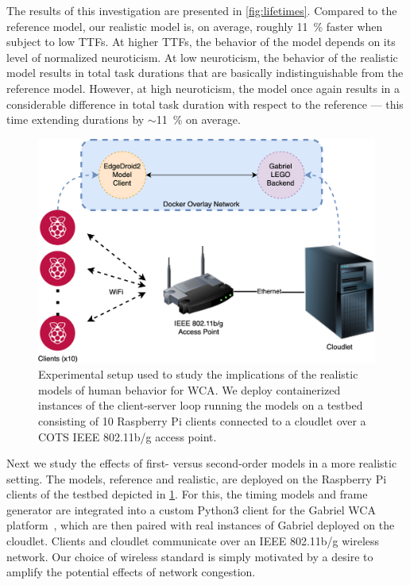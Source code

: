 The results of this investigation are presented in \cref{fig:lifetimes}.
Compared to the reference model, our realistic model is, on average, roughly \SI{11}{\percent} faster when subject to low \glspl{TTF}.
At higher \glspl{TTF}, the behavior of the model depends on its level of normalized neuroticism.
At low neuroticism, the behavior of the realistic model results in total task durations that are basically indistinguishable from the reference model.
However, at high neuroticism, the model once again results in a considerable difference in total task duration with respect to the reference --- this time extending durations by \ensuremath{\sim}\SI{11}{\percent} on average.

\begin{figure}
    \centering
    \includegraphics[width=.9\textwidth]{figs/EdgeDroid2ExperimentalSetup}
    \caption{%
        Experimental setup used to study the implications of the realistic models of human behavior for \gls{WCA}.
        We deploy containerized instances of the client-server loop running the models on a testbed consisting of \num{10} Raspberry Pi clients connected to a cloudlet over a \gls{COTS} \gls{IEEE} \num{802.11}b/g access point.
    }\label{fig:expsetup}
\end{figure}

Next we study the effects of first- versus second-order models in a more realistic setting.
The models, reference and realistic, are deployed on the Raspberry Pi clients of the testbed depicted in \cref{fig:expsetup}.
For this, the timing models and frame generator are integrated into a custom Python3 client for the Gabriel \gls{WCA} platform~\cite{chen2018application}, which are then paired with real instances of Gabriel deployed on the cloudlet.
Clients and cloudlet communicate over an \gls{IEEE} \num{802.11}b/g wireless network.
Our choice of wireless standard is simply motivated by a desire to amplify the potential effects of network congestion.

